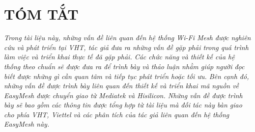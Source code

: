 \chapter*{TÓM TẮT}

\emph{Trong tài liệu này, những vấn đề liên quan đến hệ thống Wi-Fi Mesh được nghiên cứu và phát triển tại VHT, tác giả đưa ra những vấn đề gặp phải trong quá trình làm việc và triển khai thực tế đã gặp phải. Các chức năng và thiết kế của hệ thống theo chuẩn sẽ được đưa ra để trình bày và thảo luận nhằm giúp người đọc biết được những gì cần quan tâm và tiếp tục phát triển hoặc tối ưu. Bên cạnh đó, những vấn đề được trình bày liên quan đến thiết kế và triển khai mã nguồn về EasyMesh được chuyển giao từ Mediatek và Hisilicon. Những vẫn đề được trình bày sẽ bao gồm các thông tin được tổng hợp từ tài liệu mà đối tác này bàn giao cho phía VHT, Viettel và các phân tích của tác giả liên quan đến hệ thống EasyMesh này.}
